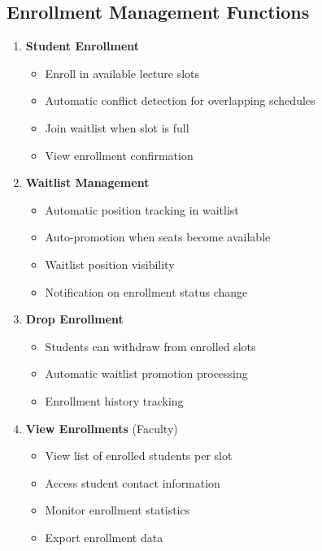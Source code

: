 \documentclass[12pt,a4paper]{report}
\begin{document}
\subsection{Enrollment Management Functions}

\begin{enumerate}[leftmargin=*]
    \item \textbf{Student Enrollment}
    \begin{itemize}
        \item Enroll in available lecture slots
        \item Automatic conflict detection for overlapping schedules
        \item Join waitlist when slot is full
        \item View enrollment confirmation
    \end{itemize}
    
    \item \textbf{Waitlist Management}
    \begin{itemize}
        \item Automatic position tracking in waitlist
        \item Auto-promotion when seats become available
        \item Waitlist position visibility
        \item Notification on enrollment status change
    \end{itemize}
    
    \item \textbf{Drop Enrollment}
    \begin{itemize}
        \item Students can withdraw from enrolled slots
        \item Automatic waitlist promotion processing
        \item Enrollment history tracking
    \end{itemize}
    
    \item \textbf{View Enrollments} (Faculty)
    \begin{itemize}
        \item View list of enrolled students per slot
        \item Access student contact information
        \item Monitor enrollment statistics
        \item Export enrollment data
    \end{itemize}
\end{enumerate}
\end{document}
